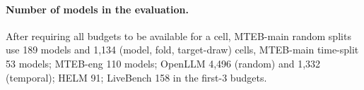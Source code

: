 \paragraph{Number of models in the evaluation.} After requiring all budgets to be available for a cell, MTEB-main random splits use 189 models and 1,134 (model, fold, target-draw) cells, MTEB-main time-split 53 models; MTEB-eng 110 models; OpenLLM 4,496 (random) and 1,332 (temporal); HELM 91; LiveBench 158 in the first-3 budgets.
